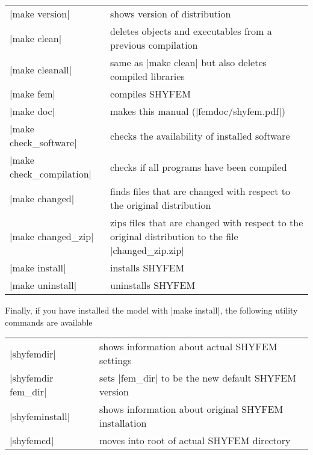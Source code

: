 \begin{center}
\begin{tabular}{ l p{7cm} }
|make version|		&	shows version of distribution \\
|make clean|		&	deletes objects and executables from a previous
                        	compilation \\
|make cleanall|		&	same as |make clean| but also deletes 
				compiled libraries \\
|make fem|		&	compiles SHYFEM \\
|make doc|		&	makes this manual (|femdoc/shyfem.pdf|) \\
|make check_software|	&	checks the availability of installed software \\
|make check_compilation|&	checks if all programs have been compiled \\
|make changed|		&	finds files that are changed with respect to the
				original distribution \\
|make changed_zip|	&	zips files that are changed with respect to the
				original distribution to the file 
				|changed_zip.zip| \\
|make install|		&	installs SHYFEM \\
|make uninstall|	&	uninstalls SHYFEM \\
\end{tabular}
\end{center}

\vspace{0.5cm}
Finally, if you have installed the model with |make install|, 
the following utility commands are available \vspace{0.5cm}

\begin{center}
\begin{tabular}{ l l }
|shyfemdir|		&	shows information about actual SHYFEM
				settings \\
|shyfemdir fem_dir|	&	sets |fem_dir| to be the new default 
				SHYFEM version \\
|shyfeminstall|		&	shows information about original SHYFEM 
				installation \\
|shyfemcd|		&	moves into root of actual SHYFEM directory \\
\end{tabular}
\end{center}
